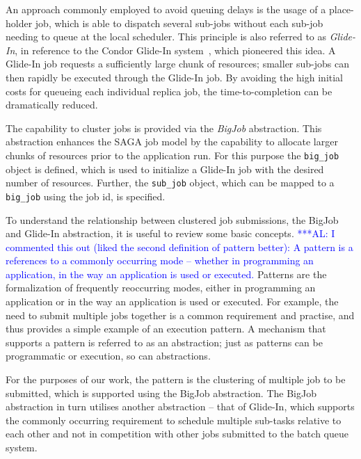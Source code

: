 \documentclass{rspublic}
\newcommand{\alnote}[1]{ {\textcolor{blue} { ***AL: #1 }}}
\newcommand{\alnote}[1]{}
\begin{document}
An approach commonly employed to avoid queuing delays is the usage of
a place-holder job, which is able to dispatch several sub-jobs without
each sub-job needing to queue at the local scheduler. This principle
is also referred to as \emph{Glide-In}, in reference to the Condor
Glide-In system~\citep{citeulike:291860}, which pioneered this idea. A
Glide-In job requests a sufficiently large chunk of resources; smaller
sub-jobs can then rapidly be executed through the Glide-In job.  By
avoiding the high initial costs for queueing each individual replica
job, the time-to-completion can be dramatically reduced.

The capability to cluster jobs is provided via the \emph{BigJob}
abstraction. This abstraction enhances the SAGA job model by the
capability to allocate larger chunks of resources prior to the
application run. For this purpose the \texttt{big\_job} object is
defined, which is used to initialize a Glide-In job with the desired
number of resources.  Further, the \texttt{sub\_job} object, which can
be mapped to a \texttt{big\_job} using the job id, is specified.

To understand the relationship between clustered job submissions, the
BigJob and Gli\-de-In abstraction, it is useful to review some basic
concepts.  \alnote{I commented this out (liked the second definition
  of pattern better): A pattern is a references to a commonly
  occurring mode -- whether in programming an application, in the way
  an application is used or executed.}  Patterns are the formalization
of frequently reoccurring modes, either in programming an
application or in the way an application is used or executed.
For example, the need to submit multiple jobs together is a
common requirement and practise, and thus provides a simple
example of an execution pattern.  A mechanism that supports a pattern
is referred to as an abstraction; just as patterns can be programmatic
or execution, so can abstractions.

For the purposes of our work, the pattern is the clustering of
multiple job to be submitted, which is supported using the BigJob
abstraction. The BigJob abstraction in turn utilises another
abstraction -- that of Glide-In, which supports the commonly occurring
requirement to schedule multiple sub-tasks relative to each other and
not in competition with other jobs submitted to the batch queue
system.
                         
\end{document}
